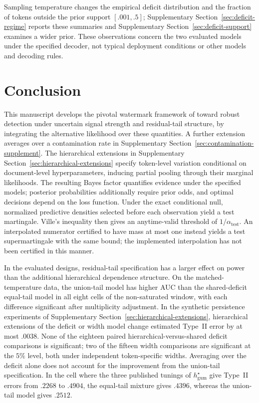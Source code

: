 \documentclass[11pt]{article}
\begin{document}
Sampling temperature changes the empirical deficit distribution and the fraction
of tokens outside the prior support $[.001,.5]$; Supplementary
Section~\ref{sec:deficit-regime} reports these summaries and
Supplementary Section~\ref{sec:deficit-support} examines a wider prior.
These observations concern the two evaluated models under the specified decoder,
not typical deployment conditions or other models and decoding rules.

\FloatBarrier
\section{Conclusion}

This manuscript develops the pivotal watermark framework of \citet{li2025framework}
toward robust detection under uncertain signal strength and residual-tail
structure, by integrating the alternative likelihood over these quantities.
A further extension averages over a contamination rate in
Supplementary Section~\ref{sec:contamination-supplement}.  The hierarchical extensions
in Supplementary Section~\ref{sec:hierarchical-extensions} specify token-level variation conditional on document-level hyperparameters, inducing
partial pooling through their marginal likelihoods.  The resulting Bayes
factor quantifies evidence under the specified models; posterior probabilities
additionally require prior odds, and optimal decisions depend on the loss
function.  Under the exact conditional null, normalized predictive densities
selected before each observation yield a test martingale.  Ville's inequality
then gives an anytime-valid threshold of $1/\alpha_{\mathrm{test}}$.  An
interpolated numerator certified to have mass at most one instead yields a
test supermartingale with the same bound; the implemented interpolation has
not been certified in this manner.

In the evaluated designs, residual-tail specification has a larger effect on
power than the additional hierarchical dependence structure.  On the
matched-temperature data, the union-tail model has higher AUC than the
shared-deficit equal-tail model in all eight cells of the non-saturated window,
with each difference significant after multiplicity adjustment.  In the
synthetic persistence experiments of Supplementary
Section~\ref{sec:hierarchical-extensions}, hierarchical extensions of the deficit or
width model change estimated Type~II error by at most $.0038$.  None of the
eighteen paired hierarchical-versus-shared deficit comparisons is significant;
two of the fifteen width comparisons are significant at the $5\%$ level, both
under independent token-specific widths.  Averaging over the deficit alone
does not account for the improvement from the union-tail specification.  In
the cell where the three published tunings of $h^\star_{\mathrm{gum}}$ give
Type~II errors from $.2268$ to $.4904$, the equal-tail mixture gives $.4396$,
whereas the union-tail model gives $.2512$.
\end{document}
